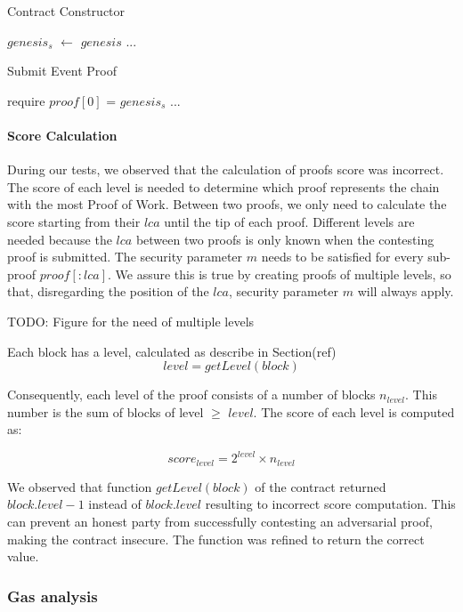 \begin{algorithm}
    \caption{Contract Constructor}
    \label{algo:avoid_premining_ctor}
    $genesis_{s}$ $\leftarrow$ $genesis$\newline
    ...
\end{algorithm}
\vspace{-0.7cm}
\begin{algorithm}
    \caption{Submit Event Proof}
    \label{algo:avoid_premining_submit}
    require $proof[0]$ = $genesis_{s}$\newline
    ...
\end{algorithm}

\paragraph{Score Calculation}

During our tests, we observed that the calculation of proofs score was
incorrect. The score of each level is needed to determine which proof
represents the chain with the most Proof of Work. Between two proofs, we only
need to calculate the score starting from their $lca$ until the tip of each
proof. Different levels are needed because the $lca$ between two proofs is only
known when the contesting proof is submitted. The security parameter $m$ needs
to be satisfied for every sub-proof $proof[:lca]$. We assure this is true by
creating proofs of multiple levels, so that, disregarding the position of the
$lca$, security parameter $m$ will always apply.

TODO: Figure for the need of multiple levels

Each block has a level, calculated as describe in Section(ref)
\[ level = getLevel(block) \]

Consequently, each level of the proof consists of a number of blocks
$n_{level}$. This number is the sum of blocks of level $\geq$ $level$.  The
score of each level is computed as:

\[score_{level} = 2^{level} \times n_{level}\]

We observed that function $getLevel(block)$ of the contract returned
$block.level-1$ instead of $block.level$ resulting to incorrect score
computation. This can prevent an honest party from successfully contesting an
adversarial proof, making the contract insecure. The function was refined to
return the correct value.

\subsubsection{Gas analysis}

